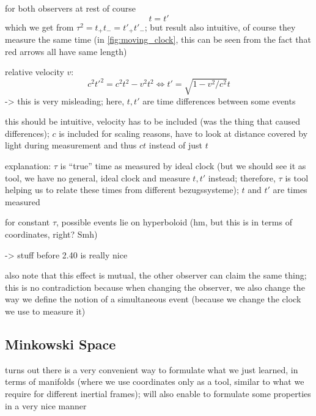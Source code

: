 \begin{ex}\label{ex:mov_obs}
for both observers at rest of course
\begin{equation*}
t = t'
\end{equation*}
which we get from $\tau^2 = t_+ t_- = t'_+ t'_-$; but result also intuitive, of course they measure the same time (in \ref{fig:moving_clock}, this can be seen from the fact that red arrows all have same length)

relative velocity $v$:
\begin{equation*}
c^2 t'^2 = c^2 t^2 - v^2 t^2 \Leftrightarrow t' = \sqrt{1 - v^2 / c^2} t %
\end{equation*}
-> this is very misleading; here, $t, t'$ are time differences between some events

this should be intuitive, velocity has to be included (was the thing that caused differences); $c$ is included for scaling reasons, have to look at distance covered by light during measurement and thus $c t$ instead of just $t$

explanation: $\tau$ is \enquote{true} time as measured by ideal clock (but we should see it as tool, we have no general, ideal clock and measure $t, t'$ instead; therefore, $\tau$ is tool helping us to relate these times from different bezugssysteme); $t$ and $t'$ are times measured


for constant $\tau$, possible events lie on hyperboloid (hm, but this is in terms of coordinates, right? Smh)

-> stuff before 2.40 is really nice



also note that this effect is mutual, the other observer can claim the same thing; this is no contradiction because when changing the observer, we also change the way we define the notion of a simultaneous event (because we change the clock we use to measure it)
\end{ex}



		\subsection{Minkowski Space}
turns out there is a very convenient way to formulate what we just learned, in terms of manifolds (where we use coordinates only as a tool, similar to what we require for different inertial frames); will also enable to formulate some properties in a very nice manner

